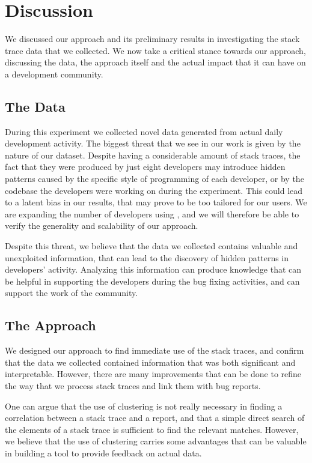 \section{Discussion}\label{sec:stacktraces-discussion}

We discussed our approach and its preliminary results in investigating the stack trace data that we collected.
We now take a critical stance towards our approach, discussing the data, the approach itself and the actual impact that it can have on a development community.


\subsection{The Data}

During this experiment we collected novel data generated from actual daily development activity.
The biggest threat that we see in our work is given by the nature of our dataset.
Despite having a considerable amount of stack traces, the fact that they were produced by just eight developers may introduce hidden patterns caused by the specific style of programming of each developer, or by the codebase the developers were working on during the experiment.
This could lead to a latent bias in our results, that may prove to be too tailored for our users.
We are expanding the number of developers using \shr, and we will therefore be able to verify the generality and scalability of our approach.

Despite this threat, we believe that the data we collected contains valuable and unexploited information, that can lead to the discovery of hidden patterns in developers' activity.
Analyzing this information can produce knowledge that can be helpful in supporting the developers during the bug fixing activities, and can support the work of the community.


\subsection{The Approach}

We designed our approach to find immediate use of the stack traces, and confirm that the data we collected contained information that was both significant and interpretable.
However, there are many improvements that can be done to refine the way that we process stack traces  and link them with bug reports.

One can argue that the use of clustering is not really necessary in finding a correlation between a stack trace and a report, and that a simple direct search of the elements of a stack trace is sufficient to find the relevant matches.
However, we believe that the use of clustering carries some advantages that can be valuable in building a tool to provide feedback on actual data.


